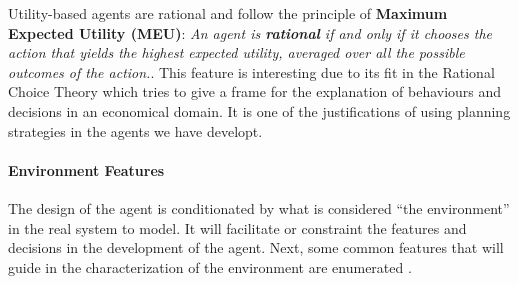 \documentclass[11pt,oneside,a4paper,openright]{report}
\begin{document}
\begin{description}
\begin{description}
		Utility-based agents are rational and follow the principle of \textbf{Maximum Expected Utility (MEU)}: 
		\textit{An agent is \textbf{rational} if and only if it chooses the action that yields the highest
		expected utility, averaged over all the possible outcomes of the action.}\cite{RussellNorvig}.
		This feature is interesting due to its fit in the Rational Choice Theory \cite{rationalchoicetheo} which tries to give a frame for the explanation of behaviours and decisions in an economical domain.
		It is one of the justifications of using planning strategies in the agents we have developt.

	\end{description}


		
\end{description}






\paragraph{Environment Features}

The design of the agent is conditionated by what is considered ``the environment'' in the real system to model.
It will facilitate or constraint the features and decisions in the development of the agent. Next, some common features that will guide in the characterization of the environment are enumerated \cite[section 2.3]{RussellNorvig}.
\end{document}
